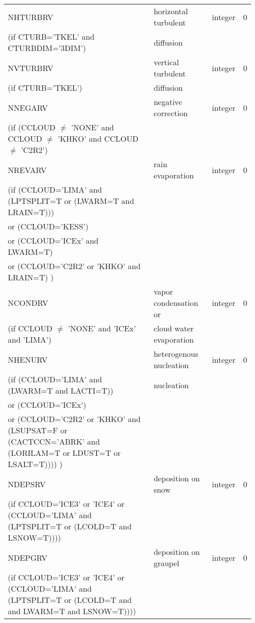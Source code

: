 \begin{longtable} {|p{}|p{}|>{\centering}p{}|p{}<{\centering}|}
NHTURBRV & horizontal turbulent & integer  &  0 \index{NHTURBRV!\innam{NAM\_BU\_RRV}}\\ \nopagebreak
(if CTURB='TKEL' and CTURBDIM='3DIM') &diffusion &   &  \\\hline
NVTURBRV & vertical turbulent& integer  &  0 \index{NVTURBRV!\innam{NAM\_BU\_RRV}}\\ \nopagebreak
(if CTURB='TKEL') &diffusion &   &  \\\hline
NNEGARV   & negative correction & integer  &  0 \index{NNEGARV\innam{NAM\_BU\_RRV}}\\ \nopagebreak
(if (CCLOUD $\neq$ 'NONE' and CCLOUD $\neq$ 'KHKO' and CCLOUD $\neq$ 'C2R2') & &   &  \\\hline
NREVARV & rain evaporation & integer  &  0 \index{NREVARV!\innam{NAM\_BU\_RRV}}\\ \nopagebreak
(if (CCLOUD='LIMA' and (LPTSPLIT=T or (LWARM=T and LRAIN=T))) & & & \\ \nopagebreak
 or (CCLOUD='KESS') & & & \\ \nopagebreak
 or (CCLOUD='ICEx' and LWARM=T) & & & \\ \nopagebreak
 or (CCLOUD='C2R2' or 'KHKO' and LRAIN=T) ) & & & \\ \hline
NCONDRV   & vapor condensation or & integer  &  0 \index{NCONDRV!\innam{NAM\_BU\_RRV}}\\ \nopagebreak
(if CCLOUD $\neq$ 'NONE' and 'ICEx' and 'LIMA') &cloud water evaporation &   &  \\\hline
NHENURV   & heterogenous nucleation & integer  &  0 \index{NHENURV!\innam{NAM\_BU\_RRV}}\\ \nopagebreak
(if (CCLOUD='LIMA' and (LWARM=T and LACTI=T)) & nucleation & & \\ \nopagebreak
 or (CCLOUD='ICEx') & & & \\ \nopagebreak
 or (CCLOUD='C2R2' or 'KHKO' and (LSUPSAT=F or (CACTCCN='ABRK' and (LORILAM=T or LDUST=T or LSALT=T)))) ) & & & \\ \hline
NDEPSRV   & deposition on snow & integer  &  0 \index{NDEPSRV!\innam{NAM\_BU\_RRV}}\\ \nopagebreak
(if CCLOUD='ICE3' or 'ICE4' or (CCLOUD='LIMA' and (LPTSPLIT=T or (LCOLD=T and LSNOW=T)))) & &   &  \\\hline
NDEPGRV   & deposition on graupel & integer  &  0 \index{NDEPGRV!\innam{NAM\_BU\_RRV}}\\ \nopagebreak
(if CCLOUD='ICE3' or 'ICE4' or (CCLOUD='LIMA' and (LPTSPLIT=T or (LCOLD=T and and LWARM=T and LSNOW=T)))) & &   &  \\\hline

\end{longtable}
